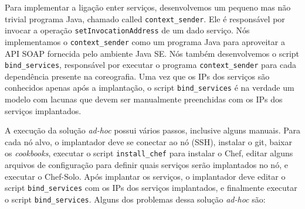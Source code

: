 Para implementar a ligação enter serviços,
desenvolvemos um pequeno mas não trivial programa Java, chamado called \texttt{context\_sender}. 
Ele é responsável por invocar a operação \texttt{setInvocationAddress} de um dado serviço.
Nós implementamos o \texttt{context\_sender} como um programa Java para
aproveitar a API SOAP fornecida pelo ambiente Java SE.
Nós também desenvolvemos o script \texttt{bind\_services},
responsável por executar o programa \texttt{context\_sender}
para cada dependência presente na coreografia.
Uma vez que os IPs dos serviços são conhecidos apenas após a implantação,
o script \texttt{bind\_services} é na verdade um modelo com lacunas
que devem ser manualmente preenchidas com os IPs dos serviços implantados.

A execução da solução \emph{ad-hoc} possui vários passos,
inclusive alguns manuais.
Para cada nó alvo, o implantador deve se conectar ao nó (SSH),
instalar o git, baixar os \emph{cookbooks}, executar o script \texttt{install\_chef} 
para instalar o Chef, editar alguns arquivos de configuração para definir
quais serviços serão implantados no nó, e executar o Chef-Solo.
Após implantar os serviços, o implantador deve editar o script
\texttt{bind\_services} com os IPs dos serviços implantados,
e finalmente executar o script \texttt{bind\_services}.
Alguns dos problemas dessa solução \emph{ad-hoc} são:


